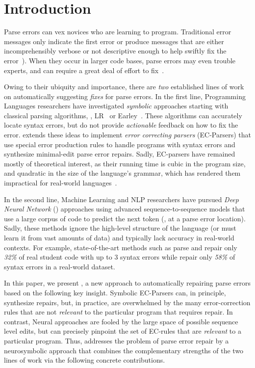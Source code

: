
\section{Introduction}
\label{sec:intro}

Parse errors can vex novices who
are learning to program.
%
Traditional error messages
only indicate the first error
or produce messages that
are either incomprehensibly
verbose or not descriptive
enough to help swiftly fix
the error~\citep{qian2017, VanDerSpek_2005}).
%
When they occur in larger code bases, parse errors
may even trouble experts, and can require a great deal of
effort to fix~\citep{Denny_2012, Ahadi_2018, Kummerfeld2003}.

Owing to their ubiquity and importance, there are \emph{two}
established lines of work on automatically suggesting \emph{fixes}
for parse errors.
%
In the first line, Programming Languages researchers
have investigated \emph{symbolic} approaches starting
with classical parsing algorithms, \eg, LR~\citep{Aho1974}
or Earley~\citep{Earley_1970}.
%
These algorithms can accurately locate syntax errors,
but do not provide \emph{actionable} feedback on how
to fix the error.
%
\citet{Aho_1972} extends these ideas to implement
\emph{error correcting parsers} (EC-Parsers) that
use special error production rules to handle
programs with syntax errors and 
synthesize minimal-edit parse error repairs.
%
Sadly, EC-parsers have remained mostly of theoretical
interest, as their running time is cubic in the 
program size, and quadratic in the size of the language's
grammar, which has rendered them impractical for 
real-world languages~\citep{McLean1996, Rajasekaran2014}.

In the second line, Machine Learning and NLP researchers have
pursued \emph{Deep Neural Network} (\dnn)
approaches using advanced sequence-to-sequence
models \citep{Sutskever_2014, Hardalov_2018}
that use a large corpus of code to predict
the next token (\eg, at a parse error location).
%
Sadly, these methods ignore the high-level structure
of the language (or must learn it from vast amounts
of data) and typically lack accuracy in real-world contexts.
%
For example, state-of-the-art methods such as \citet{Ahmed_2021} parse and
repair only \emph{32\%} of real student code with up to 3 syntax errors
while \citet{Wu2020} repair only \emph{58\%} of syntax errors in a
real-world dataset.

In this paper, we present \toolname, a new approach
to automatically repairing parse errors
based on the following key insight.
%
Symbolic EC-Parsers \citep{Aho_1972} can, in principle,
synthesize repairs, but, in practice, are overwhelmed by
the many error-correction rules that are not \emph{relevant}
to the particular program that requires repair.
%
In contrast, Neural approaches are fooled by the large
space of possible sequence level edits, but can precisely
pinpoint the set of EC-rules that are \emph{relevant}
to a particular program.
%
Thus, \toolname addresses the problem of parse error
repair by a neurosymbolic approach that combines
the complementary strengths of the two lines of work
via the following concrete contributions.

